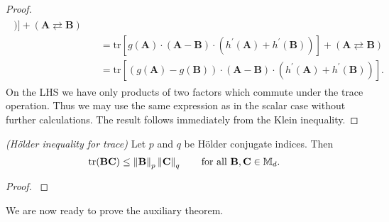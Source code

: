 \begin{proof}
\begin{align}
\begin{split}
    )
  ]
  +
  (\mathbf{A} \rightleftarrows \mathbf{B})
  \\
  &\quad=
  \mathrm{tr}
  [
    g(\mathbf{A})
    \cdot
    (
    \mathbf{A}
    -
    \mathbf{B}
    )
    \cdot
    (
    h^{'}(\mathbf{A})
    +
    h^{'}(\mathbf{B})
    )
  ]
  +
  (\mathbf{A} \rightleftarrows \mathbf{B})
  \\
  &\quad=
  \mathrm{tr}
  [
  (
    g(\mathbf{A})
    -
    g(\mathbf{B})
  )
    \cdot
    (
    \mathbf{A}
    -
    \mathbf{B}
    )
    \cdot
    (
    h^{'}(\mathbf{A})
    +
    h^{'}(\mathbf{B})
    )
  ].
    \end{split}
  \end{align}
  On the LHS we have only products of two factors which commute under the trace operation. Thus we may use the same expression as in the scalar case without further calculations.
  The result follows immediately from the Klein inequality.
\end{proof}




\begin{proposition}
  \emph{(Hölder inequality for trace)}
  Let 
  $p$ and $q$
  be Hölder conjugate indices.
  Then
  \begin{gather}
    \mathrm{tr}
    (
    \mathbf{BC}
    )
    \le
    \norm{\mathbf{B}}_p
    \norm{\mathbf{C}}_q
    \qquad
    \text{for all}
    \ 
    \mathbf{B}
    ,
    \mathbf{C}
    \in 
    \mathbb{M}_d
    .
  \end{gather}
\end{proposition}
\begin{proof}
  \cite[Corollary~IV.2.6]{Bhatia1997}
\end{proof}


We are now ready to prove the auxiliary theorem.

